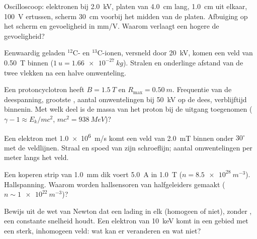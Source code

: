 \begin{exercise}[$\star\star$]\label{exo:b1:charged-particles:5}
Oscilloscoop: elektronen bij \qty{2.0}{kV}, platen van \qty{4.0}{cm} lang,
\qty{1.0}{cm} uit elkaar, \qty{100}{V} ertussen, scherm \qty{30}{cm} voorbij
het midden van de platen. Afbuiging op het scherm en gevoeligheid in mm/V.
Waarom verlaagt een hogere  de gevoeligheid?
\end{exercise}

\begin{exercise}[$\star\star$]\label{exo:b1:charged-particles:6}
Eenwaardig geladen $^{12}$C- en $^{13}$C-ionen, versneld door
\qty{20}{kV}, komen een veld van \qty{0.50}{T} binnen ($\qty{1}{u} = \qty{1.66e-27}{kg}$).
Stralen en onderlinge afstand van de twee vlekken na een halve omwenteling.
\end{exercise}

\begin{exercise}[$\star\star$]\label{exo:b1:charged-particles:7}
Een protoncyclotron heeft $B = \qty{1.5}{T}$ en $R_{\max} = \qty{0.50}{m}$.
Frequentie van de deespanning, grootste , aantal omwentelingen
bij \qty{50}{kV} op de dees, verblijftijd binnenin. Met welk deel is
de massa van het proton bij de uitgang toegenomen ($\gamma - 1 \approx E_k/mc^2$,
$mc^2 = \qty{938}{MeV}$)?
\end{exercise}

\begin{exercise}[$\star\star$]\label{exo:b1:charged-particles:8}
Een elektron met \qty{1.0e6}{m/s} komt een veld van \qty{2.0}{mT} binnen onder $30^\circ$
met de veldlijnen. Straal en spoed van zijn schroeflijn; aantal omwentelingen per
meter langs het veld.
\end{exercise}

\begin{exercise}[$\star\star$]\label{exo:b1:charged-particles:9}
Een koperen strip van \qty{1.0}{mm} dik voert \qty{5.0}{A} in \qty{1.0}{T}
($n = \qty{8.5e28}{m^{-3}}$). Hallspanning. Waarom worden hallsensoren van
halfgeleiders gemaakt ($n \sim \qty{1e22}{m^{-3}}$)?
\end{exercise}

\begin{exercise}[$\star\star\star$]\label{exo:b1:charged-particles:10}
Bewijs uit de wet van Newton dat een lading in elk  (homogeen of
niet), zonder , een constante snelheid houdt. Een elektron van
\qty{10}{keV} komt in een gebied met een sterk, inhomogeen veld: wat kan er
veranderen en wat niet?
\end{exercise}

